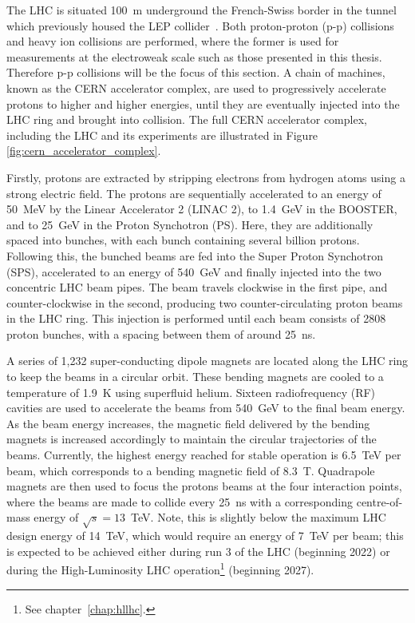 The LHC is situated 100~m underground the French-Swiss border in the tunnel which previously housed the LEP collider~\cite{lep_design}. Both proton-proton (p-p) collisions and heavy ion collisions are performed, where the former is used for measurements at the electroweak scale such as those presented in this thesis. Therefore p-p collisions will be the focus of this section. A chain of machines, known as the CERN accelerator complex, are used to progressively accelerate protons to higher and higher energies, until they are eventually injected into the LHC ring and brought into collision. The full CERN accelerator complex, including the LHC and its experiments are illustrated in Figure \ref{fig:cern_accelerator_complex}.

Firstly, protons are extracted by stripping electrons from hydrogen atoms using a strong electric field. The protons are sequentially accelerated to an energy of 50~MeV by the Linear Accelerator 2 (LINAC 2), to 1.4~GeV in the BOOSTER, and to 25~GeV in the Proton Synchotron (PS). Here, they are additionally spaced into bunches, with each bunch containing several billion protons. Following this, the bunched beams are fed into the Super Proton Synchotron (SPS), accelerated to an energy of 540~GeV and finally injected into the two concentric LHC beam pipes. The beam travels clockwise in the first pipe, and counter-clockwise in the second, producing two counter-circulating proton beams in the LHC ring. This injection is performed until each beam consists of 2808 proton bunches, with a spacing between them of around 25~ns.

A series of 1,232 super-conducting dipole magnets are located along the LHC ring to keep the beams in a circular orbit. These bending magnets are cooled to a temperature of 1.9~K using superfluid helium. Sixteen radiofrequency (RF) cavities are used to accelerate the beams from 540~GeV to the final beam energy. As the beam energy increases, the magnetic field delivered by the bending magnets is increased accordingly to maintain the circular trajectories of the beams. Currently, the highest energy reached for stable operation is 6.5~TeV per beam, which corresponds to a bending magnetic field of 8.3~T. Quadrapole magnets are then used to focus the protons beams at the four interaction points, where the beams are made to collide every 25~ns with a corresponding centre-of-mass energy of $\sqrt{s}=13$~TeV. Note, this is slightly below the maximum LHC design energy of 14~TeV, which would require an energy of 7~TeV per beam; this is expected to be achieved either during run 3 of the LHC (beginning 2022) or during the High-Luminosity LHC operation\footnote{See chapter~\ref{chap:hllhc}.} (beginning 2027).

